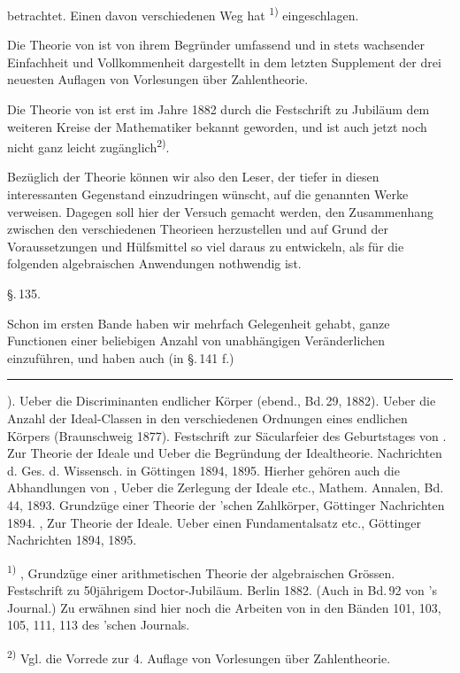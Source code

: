 
betrachtet. Einen davon verschiedenen Weg hat
\textsuperscript{1)} eingeschlagen.

Die Theorie von  ist von ihrem Begr\"under umfassend und
in stets wachsender Einfachheit und Vollkommenheit dargestellt in dem
letzten Supplement der drei neuesten Auflagen von 
Vorlesungen \"uber Zahlentheorie.

Die Theorie von  ist erst im Jahre 1882 durch die
Festschrift zu  Jubil\"aum dem weiteren Kreise der
Mathematiker bekannt geworden, und ist auch jetzt noch nicht ganz leicht
zug\"anglich\textsuperscript{2)}.

Bez\"uglich der  Theorie k\"onnen wir also den
Leser, der tiefer in diesen interessanten Gegenstand einzudringen
w\"unscht, auf die genannten Werke verweisen. Dagegen soll hier der Versuch
gemacht werden, den Zusammenhang zwischen den verschiedenen Theorieen
herzustellen und auf Grund der  Voraussetzungen
und H\"ulfsmittel so viel daraus zu entwickeln, als f\"ur die folgenden
algebraischen Anwendungen nothwendig ist.

\begin{center}
\S.\,135.

\end{center}

Schon im ersten Bande haben wir mehrfach Gelegenheit gehabt, ganze
Functionen einer beliebigen Anzahl von unabh\"angigen Ver\"anderlichen
einzuf\"uhren, und haben auch (in \S.\,141 f.)

\vspace{1em}\hrule\vspace{0.5em}

). Ueber die Discriminanten endlicher K\"orper (ebend.,
Bd.\,29, 1882). Ueber die Anzahl der Ideal-Classen in den verschiedenen
Ordnungen eines endlichen K\"orpers (Braunschweig 1877). Festschrift zur
S\"acularfeier des Geburtstages von . \glqq Zur Theorie der
Ideale\grqq{} und \glqq Ueber die Begr\"undung der Idealtheorie\grqq{}.
Nachrichten d. Ges. d. Wissensch. in G\"ottingen 1894, 1895. Hierher
geh\"oren auch die Abhandlungen von , \glqq Ueber die
Zerlegung der Ideale etc.\grqq{}, Mathem. Annalen, Bd.\,44, 1893. \glqq
Grundz\"uge einer Theorie der 'schen Zahlk\"orper\grqq{}, G\"ottinger
Nachrichten 1894. , \glqq Zur Theorie der Ideale\grqq{}.
\glqq Ueber einen Fundamentalsatz etc.\grqq{}, G\"ottinger Nachrichten 1894,
1895.

\noindent\textsuperscript{1)} , Grundz\"uge einer
arithmetischen Theorie der algebraischen Gr\"ossen. Festschrift zu
 50j\"ahrigem Doctor-Jubil\"aum. Berlin 1882. (Auch in
Bd.\,92 von 's Journal.) Zu erw\"ahnen sind hier noch die Arbeiten von
 in den B\"anden 101, 103, 105, 111, 113 des 'schen
Journals.

\noindent\textsuperscript{2)} Vgl. die Vorrede zur 4. Auflage von
 Vorlesungen \"uber Zahlentheorie.
